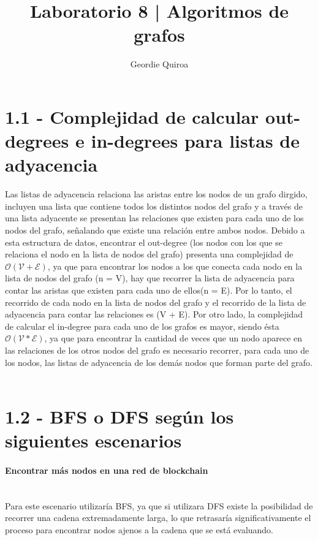 \documentclass[10pt, letter]{report}
\title{	Laboratorio 8 | Algoritmos de grafos}
\author{Geordie Quiroa}
\begin{document}
\maketitle

\section*{1.1 - Complejidad de calcular out-degrees e in-degrees para listas de adyacencia}
Las listas de adyacencia relaciona las aristas entre los nodos de un grafo dirgido, incluyen una lista que contiene todos los distintos nodos del grafo y a través de una lista adyacente se presentan las relaciones que existen para cada uno de los nodos del grafo, señalando que existe una relación entre ambos nodos. Debido a esta estructura de datos, encontrar el out-degree (los nodos con los que se relaciona el nodo en la lista de nodos del grafo) presenta una complejidad de $\mathcal{O(V + E)}$, ya que para encontrar los nodos a los que conecta cada nodo en la lista de nodos del grafo (n = V), hay que recorrer la lista de adyacencia para contar las aristas que existen para cada uno de ellos(n = E). Por lo tanto, el recorrido de cada nodo en la lista de nodos del grafo y el recorrido de la lista de adyacencia para contar las relaciones es (V + E). Por otro lado, la complejidad de calcular el in-degree para cada uno de los grafos es mayor, siendo ésta $\mathcal{O(V * E)}$, ya que para encontrar la cantidad de veces que un nodo aparece en las relaciones de los otros nodos del grafo es necesario recorrer, para cada uno de los nodos, las listas de adyacencia de los demás nodos que forman parte del grafo.\\
\\
\section*{1.2 - BFS o DFS según los siguientes escenarios}
\paragraph{Encontrar más nodos en una red de blockchain}~\\
Para este escenario utilizaría BFS, ya que si utilizara DFS existe la posibilidad de recorrer una cadena extremadamente larga, lo que retrasaría significativamente el proceso para encontrar nodos ajenos a la cadena que se está evaluando.~\\
\end{document}
